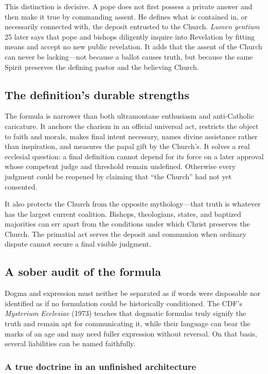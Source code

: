 This distinction is decisive. A pope does not first possess a private answer and then make it true by commanding assent. He defines what is contained in, or necessarily connected with, the deposit entrusted to the Church. \emph{Lumen gentium} 25 later says that pope and bishops diligently inquire into Revelation by fitting means and accept no new public revelation. It adds that the assent of the Church can never be lacking—not because a ballot causes truth, but because the same Spirit preserves the defining pastor and the believing Church.

\subsection{The definition's durable strengths}

The formula is narrower than both ultramontane enthusiasm and anti-Catholic caricature. It anchors the charism in an official universal act, restricts the object to faith and morals, makes final intent necessary, names divine assistance rather than inspiration, and measures the papal gift by the Church's. It solves a real ecclesial question: a final definition cannot depend for its force on a later approval whose competent judge and threshold remain undefined. Otherwise every judgment could be reopened by claiming that “the Church” had not yet consented.

It also protects the Church from the opposite mythology—that truth is whatever has the largest current coalition. Bishops, theologians, states, and baptized majorities can err apart from the conditions under which Christ preserves the Church. The primatial act serves the deposit and communion when ordinary dispute cannot secure a final visible judgment.

\subsection{A sober audit of the formula}

Dogma and expression must neither be separated as if words were disposable nor identified as if no formulation could be historically conditioned. The CDF's \emph{Mysterium Ecclesiae} (1973) teaches that dogmatic formulas truly signify the truth and remain apt for communicating it, while their language can bear the marks of an age and may need fuller expression without reversal. On that basis, several liabilities can be named faithfully.

\subsubsection{A true doctrine in an unfinished architecture}

